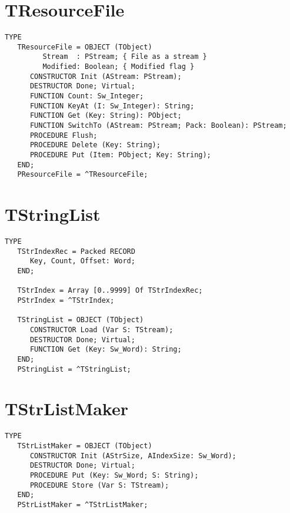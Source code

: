\section{TResourceFile}
\label{se:TResourceFile}

\begin{verbatim}
TYPE
   TResourceFile = OBJECT (TObject)
         Stream  : PStream; { File as a stream }
         Modified: Boolean; { Modified flag }
      CONSTRUCTOR Init (AStream: PStream);
      DESTRUCTOR Done; Virtual;
      FUNCTION Count: Sw_Integer;
      FUNCTION KeyAt (I: Sw_Integer): String;
      FUNCTION Get (Key: String): PObject;
      FUNCTION SwitchTo (AStream: PStream; Pack: Boolean): PStream;
      PROCEDURE Flush;
      PROCEDURE Delete (Key: String);
      PROCEDURE Put (Item: PObject; Key: String);
   END;
   PResourceFile = ^TResourceFile;
\end{verbatim}

\section{TStringList}
\label{se:TStringList}

\begin{verbatim}
TYPE
   TStrIndexRec = Packed RECORD
      Key, Count, Offset: Word;
   END;

   TStrIndex = Array [0..9999] Of TStrIndexRec;
   PStrIndex = ^TStrIndex;

   TStringList = OBJECT (TObject)
      CONSTRUCTOR Load (Var S: TStream);
      DESTRUCTOR Done; Virtual;
      FUNCTION Get (Key: Sw_Word): String;
   END;
   PStringList = ^TStringList;
\end{verbatim}

\section{TStrListMaker}
\label{se:TStrListMaker}

\begin{verbatim}
TYPE
   TStrListMaker = OBJECT (TObject)
      CONSTRUCTOR Init (AStrSize, AIndexSize: Sw_Word);
      DESTRUCTOR Done; Virtual;
      PROCEDURE Put (Key: Sw_Word; S: String);
      PROCEDURE Store (Var S: TStream);
   END;
   PStrListMaker = ^TStrListMaker;
\end{verbatim}

